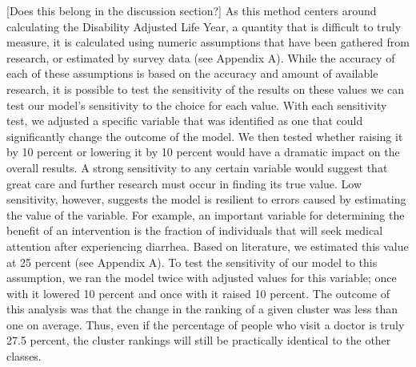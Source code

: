 [Does this belong in the discussion section?]
As this method centers around calculating the Disability Adjusted Life Year, a quantity that is difficult to truly measure, it is calculated using numeric assumptions that have been gathered from research, or estimated by survey data (see Appendix A).
While the accuracy of each of these assumptions is based on the accuracy and amount of available research, it is possible to test the sensitivity of the results on these values we can test our model's sensitivity to the choice for each value.
With each sensitivity test, we adjusted a specific variable that was identified as one that could significantly change the outcome of the model.
We then tested whether raising it by 10 percent or lowering it by 10 percent would have a dramatic impact on the overall results.
A strong sensitivity to any certain variable would suggest that great care and further research must occur in finding its true value.
Low sensitivity, however, suggests the model is resilient to errors caused by estimating the value of the variable.
For example, an important variable for determining the benefit of an intervention is the fraction of individuals that will seek medical attention after experiencing diarrhea.
Based on literature, we estimated this value at 25 percent (see Appendix A).
To test the sensitivity of our model to this assumption, we ran the model twice with adjusted values for this variable; once with it lowered 10 percent and once with it raised 10 percent.
The outcome of this analysis was that the change in the ranking of a given cluster was less than one on average.
Thus, even if the percentage of people who visit a doctor is truly 27.5 percent, the cluster rankings will still be practically identical to the other classes.  

